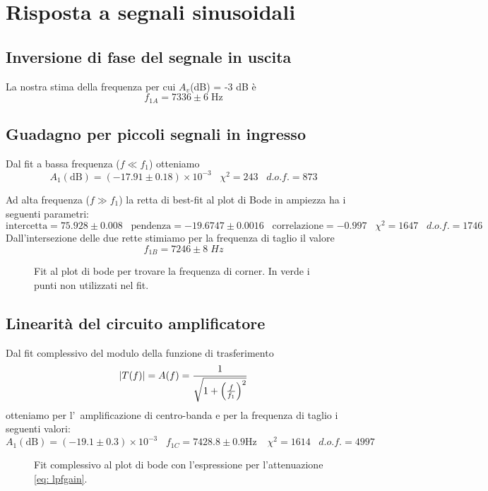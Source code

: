 \documentclass[10pt,a4paper]{article}
\begin{document}
\section{Risposta a segnali sinusoidali}

\subsection{Inversione di fase del segnale in uscita}
La nostra stima della frequenza per cui $A_v$(dB) = -3 dB \`e
\[
f_{1A} = 7336 \pm 6 \; \si{\Hz}
\]

\subsection{Guadagno per piccoli segnali in ingresso}
Dal fit a bassa frequenza ($f\ll f_1$) otteniamo
\[
A_1(\mathrm{dB}) = \left(-17.91 \pm 0.18\right)\times 10^{-3} \;\;\;
\chi^2 = 243 \;\;\; d.o.f. = 873
\]

Ad alta frequenza ($f \gg f_1$) la retta di best-fit al plot di Bode in 
ampiezza ha i seguenti parametri:
\[
\mathrm{intercetta} = 75.928 \pm 0.008 \;\;\;\mathrm{pendenza} = -19.6747 \pm 
0.0016 \;\;\;\mathrm{correlazione} 
= -0.997 \;\;\; \chi^2 = 1647 \;\;\; d.o.f. = 1746
\]
Dall'intersezione delle due rette stimiamo per la frequenza di taglio il valore
\[
f_{1B} = 7246 \pm 8 \; \si{Hz}
\]

\begin{figure}[htbp]
\centering
\caption{Fit al plot di bode per trovare la frequenza di corner. In verde i
punti non utilizzati nel fit. \label{fig: corner}}
\end{figure}

\subsection{Linearità del circuito amplificatore}
Dal fit complessivo del modulo della funzione di trasferimento
\begin{equation}\label{eq: lpfgain}
\left| T(f) \right| = A(f) = \frac{1}{\sqrt{1 + \left(\frac{f}{f_1}\right)^2}}
\end{equation}
otteniamo per l'~amplificazione di centro-banda e per la frequenza di taglio i 
seguenti valori:
\[
A_1 (\mathrm{dB}) = \left(-19.1 \pm 0.3\right)\times 10^{-3} \;\;\;
f_{1C} = 7428.8 \pm 0.9 \si{\Hz} \;\;\;\ \chi^2 = 1614 \;\;\; d.o.f.= 4997
\]

\begin{figure}[htb]
\centering
\caption{Fit complessivo al plot di bode con l'espressione per l'attenuazione
\eqref{eq: lpfgain}.\label{fig: lpfbodefit}}
\end{figure}
\end{document}
